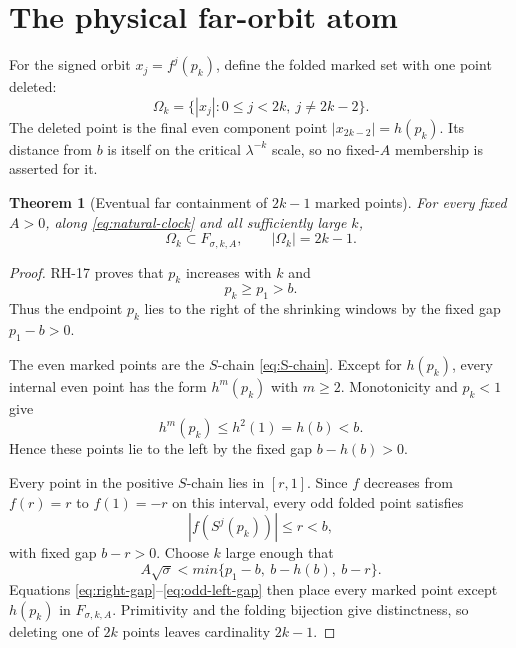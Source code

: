 \documentclass[11pt]{article}
\newtheorem{theorem}{Theorem}[section]
\theoremstyle{remark}
\begin{document}
\section{The physical far-orbit atom}

For the signed orbit $x_j=f^j(p_k)$, define the folded marked set with one
point deleted:
\begin{equation}\label{eq:Omega}
 \Omega_k=
 \{|x_j|:0\le j<2k,\ j\ne2k-2\}.
\end{equation}
The deleted point is the final even component point
$|x_{2k-2}|=h(p_k)$.  Its distance from $b$ is itself on the critical
$\lambda^{-k}$ scale, so no fixed-$A$ membership is asserted for it.

\begin{theorem}[Eventual far containment of $2k-1$ marked points]
\label{thm:containment}
For every fixed $A>0$, along \eqref{eq:natural-clock} and all sufficiently
large $k$,
\begin{equation}\label{eq:Omega-in-F}
 \Omega_k\subset F_{\sigma,k,A},
 \qquad |\Omega_k|=2k-1.
\end{equation}
\end{theorem}

\begin{proof}
RH-17 proves that $p_k$ increases with $k$ and
\begin{equation}\label{eq:right-gap}
 p_k\ge p_1>b.
\end{equation}
Thus the endpoint $p_k$ lies to the right of the shrinking windows by the
fixed gap $p_1-b>0$.

The even marked points are the $S$-chain \eqref{eq:S-chain}.  Except for
$h(p_k)$, every internal even point has the form $h^m(p_k)$ with $m\ge2$.
Monotonicity and $p_k<1$ give
\begin{equation}\label{eq:even-left-gap}
 h^m(p_k)\le h^2(1)=h(b)<b.
\end{equation}
Hence these points lie to the left by the fixed gap $b-h(b)>0$.

Every point in the positive $S$-chain lies in $[r,1]$.  Since $f$ decreases
from $f(r)=r$ to $f(1)=-r$ on this interval, every odd folded point satisfies
\begin{equation}\label{eq:odd-left-gap}
 |f(S^j(p_k))|\le r<b,
\end{equation}
with fixed gap $b-r>0$.  Choose $k$ large enough that
\begin{equation*}
 A\sqrt\sigma<min\{p_1-b,\ b-h(b),\ b-r\}.
\end{equation*}
Equations \eqref{eq:right-gap}--\eqref{eq:odd-left-gap} then place every
marked point except $h(p_k)$ in $F_{\sigma,k,A}$.  Primitivity and the
folding bijection give distinctness, so deleting one of $2k$ points leaves
cardinality $2k-1$.
\end{proof}
\end{document}
